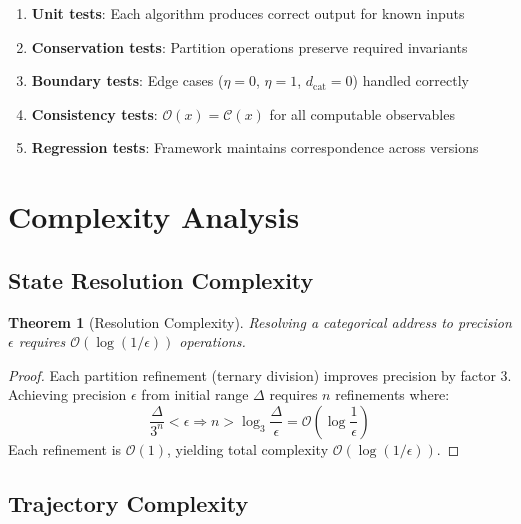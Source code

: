 \documentclass[10pt,twocolumn]{article}
\theoremstyle{plain}
\newtheorem{theorem}{Theorem}[section]
\theoremstyle{definition}
\theoremstyle{remark}
\newcommand{\dcat}{d_{\mathrm{cat}}}
\newcommand{\Obs}{\mathcal{O}}
\newcommand{\Comp}{\mathcal{C}}
\newcommand{\bigO}{\mathcal{O}}
\begin{document}
\begin{enumerate}
\item \textbf{Unit tests}: Each algorithm produces correct output for known inputs
\item \textbf{Conservation tests}: Partition operations preserve required invariants
\item \textbf{Boundary tests}: Edge cases ($\eta = 0$, $\eta = 1$, $\dcat = 0$) handled correctly
\item \textbf{Consistency tests}: $\Obs(x) = \Comp(x)$ for all computable observables
\item \textbf{Regression tests}: Framework maintains correspondence across versions
\end{enumerate}

\section{Complexity Analysis}
\label{sec:complexity}

\subsection{State Resolution Complexity}

\begin{theorem}[Resolution Complexity]
\label{thm:resolution_complexity}
Resolving a categorical address to precision $\epsilon$ requires $\bigO(\log(1/\epsilon))$ operations.
\end{theorem}

\begin{proof}
Each partition refinement (ternary division) improves precision by factor 3. Achieving precision $\epsilon$ from initial range $\Delta$ requires $n$ refinements where:
\begin{equation}
\frac{\Delta}{3^n} < \epsilon \Rightarrow n > \log_3\frac{\Delta}{\epsilon} = \bigO\left(\log\frac{1}{\epsilon}\right)
\end{equation}
Each refinement is $\bigO(1)$, yielding total complexity $\bigO(\log(1/\epsilon))$.
\end{proof}

\subsection{Trajectory Complexity}
\end{document}
